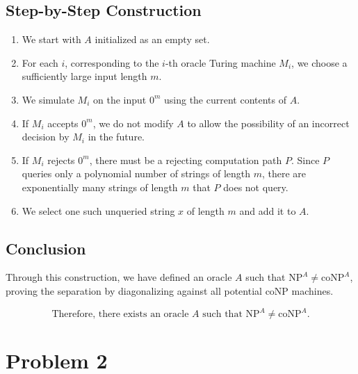 \documentclass{article}
\begin{document}
\subsection*{Step-by-Step Construction}
\begin{enumerate}
    \item We start with $A$ initialized as an empty set.
    \item For each $i$, corresponding to the $i$-th oracle Turing machine $M_i$, we choose a sufficiently large input length $m$.
    \item We simulate $M_i$ on the input $0^m$ using the current contents of $A$.
    \item If $M_i$ accepts $0^m$, we do not modify $A$ to allow the possibility of an incorrect decision by $M_i$ in the future.
    \item If $M_i$ rejects $0^m$, there must be a rejecting computation path $P$. Since $P$ queries only a polynomial number of strings of length $m$, there are exponentially many strings of length $m$ that $P$ does not query.
    \item We select one such unqueried string $x$ of length $m$ and add it to $A$.
\end{enumerate}
\subsection*{Conclusion}

Through this construction, we have defined an oracle $A$ such that $\text{NP}^A \neq \text{coNP}^A$, proving the separation by diagonalizing against all potential $\text{coNP}$ machines.

\[
\boxed{\text{Therefore, there exists an oracle } A \text{ such that } \text{NP}^A \neq \text{coNP}^A.}
\]

\pagebreak
\section{Problem 2}
\end{document}
